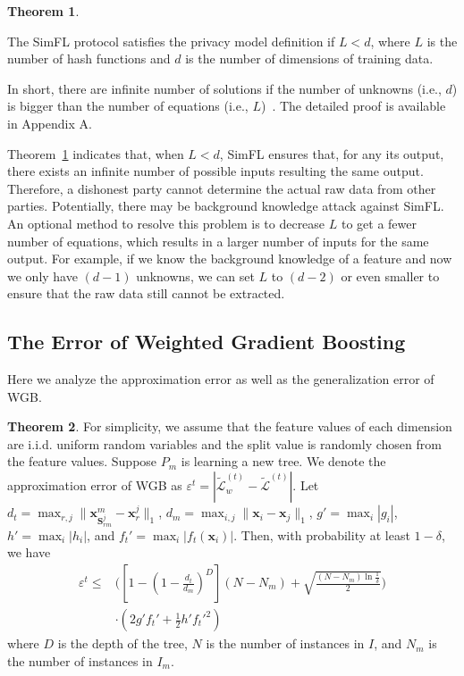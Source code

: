 \documentclass[letterpaper]{article} %
\theoremstyle{definition}
\newtheorem{theorem}{Theorem}
\newcommand\norm[1]{\lVert#1\rVert}
\newcommand{\mtx}[1]{\ensuremath{\mathbf{#1}}}
\begin{document}
\begin{theorem}
\label{theorem:secure}

The SimFL protocol satisfies the privacy model definition if $L < d$, where $L$ is the number of hash functions and $d$ is the number of dimensions of training data.
\end{theorem}


In short, there are infinite number of solutions if the number of unknowns (i.e., $d$) is bigger than the number of equations (i.e., $L$)~\cite{ladyzhenskaia1968linear}. The detailed proof is available in Appendix A.

Theorem~\ref{theorem:secure} indicates that, when $L<d$, SimFL ensures that, for any its output, there exists an infinite number of possible inputs resulting the same output. Therefore, a dishonest party cannot determine the actual raw data from other parties. Potentially, there may be background knowledge attack against SimFL. An optional method to resolve this problem is to decrease $L$ to get a fewer number of equations, which results in a larger number of inputs for the same output. For example, if we know the background knowledge of a feature and now we only have $(d-1)$ unknowns, we can set $L$ to $(d-2)$ or even smaller to ensure that the raw data  still cannot be extracted. 

\subsection{The Error of Weighted Gradient Boosting}
\label{sec:error_formula}
Here we analyze the approximation error as well as the generalization error of WGB.
\begin{theorem}
\label{theorem:upperbound}
For simplicity, we assume that the feature values of each dimension are i.i.d. uniform random variables and the split value is randomly chosen from the feature values. Suppose $P_m$ is learning a new tree. We denote the approximation error of WGB as $\varepsilon^t = |\mathcal{\tilde{L}}_w^{(t)} - \mathcal{\tilde{L}}^{(t)}|$. Let $d_t = \max_{r,j}\norm{\mathbf{x}_{\mtx{S}_{rm}^j}^m-\mathbf{x}_r^j}_1$, $d_{m} = \max_{i,j}\norm{\mathbf{x}_i- \mathbf{x}_j}_1$, $g'=\max_i |g_i|$, $h'=\max_i |h_i|$, and $f_t'=\max_i |f_t(\mathbf{x}_i)|$. Then, with probability at least $1-\delta$, we have 
\begin{equation}
\begin{aligned}
\label{eq:upperbound}
    \varepsilon^t \leq &\Big([1-(1-\frac{d_t}{d_m})^D](N-N_m)+\sqrt{\frac{(N-N_m)\ln{\frac{1}{\delta}}}{2}}\Big) \\
    & \cdot (2g' f_t'+\frac{1}{2}h' f_t'^2)  
\end{aligned}
\end{equation}
where $D$ is the depth of the tree, $N$ is the number of instances in $I$, and $N_m$ is the number of instances in $I_m$.
\end{theorem}
\end{document}
